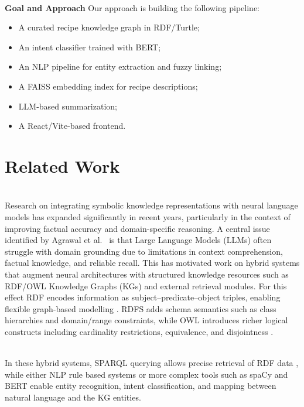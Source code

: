 \documentclass[conference]{IEEEtran}
\begin{document}
\noindent
\\
\textbf{Goal and Approach}
Our approach is building the following pipeline:



\begin{itemize}
  \item A curated recipe knowledge graph in RDF/Turtle;
  \item An intent classifier trained with BERT;
  \item An NLP pipeline for entity extraction and fuzzy linking;
  \item A FAISS embedding index for recipe descriptions;
  \item LLM-based summarization;
  \item A React/Vite-based frontend.
\end{itemize}



\section{Related Work}

\noindent
\\
Research on integrating symbolic knowledge representations with neural language models has expanded significantly in recent years, particularly in the context of improving factual accuracy and domain-specific reasoning. A central issue identified by Agrawal et al.~\cite{agrawal2024kg_hallucinations} is that Large Language Models (LLMs) often struggle with domain grounding due to limitations in context comprehension, factual knowledge, and reliable recall. This has motivated work on hybrid systems that augment neural architectures with structured knowledge resources such as RDF/OWL Knowledge Graphs (KGs) and external retrieval modules. For this effect RDF encodes information as subject–predicate–object triples, enabling flexible graph-based modelling \cite{KL2025slides}. RDFS adds schema semantics such as class hierarchies and domain/range constraints, while OWL introduces richer logical constructs including cardinality restrictions, equivalence, and disjointness \cite{KL2025slides}.

\noindent
\\
In these hybrid systems, SPARQL querying allows precise retrieval of RDF data \cite{KL2025slides}, while either NLP rule based systems or more complex tools such as spaCy \cite{honnibal2020spacy} and BERT \cite{devlin2019bert} enable entity recognition, intent classification, and mapping between natural language and the KG entities. 
\end{document}
